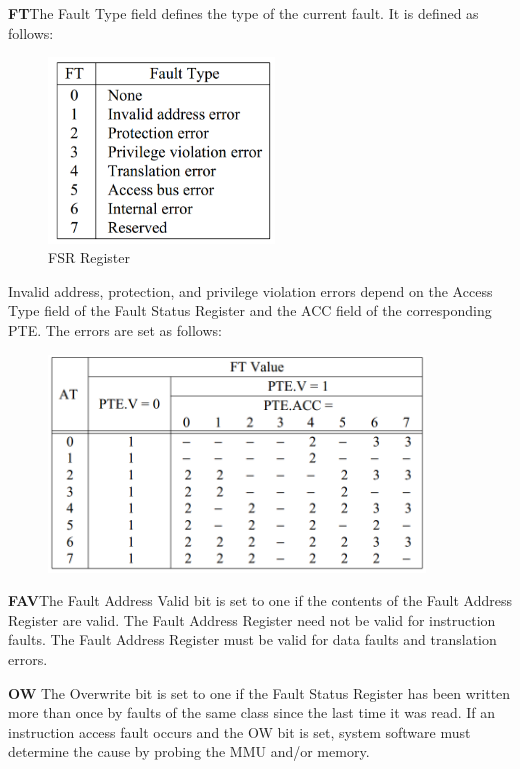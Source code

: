 \documentclass[12pt,a4paper]{article}
\begin{document}
\textbf{FT}The Fault Type field defines the type of the current fault. It is defined as follows:
\begin{figure}[h]
\centering
\includegraphics[width=6cm]{./figs/FT.png}
\caption{FSR Register}
\label{fig:AT}
\end{figure}

\newpage
Invalid address, protection, and privilege violation errors depend on the Access
Type field of the Fault Status Register and the ACC field of the corresponding
PTE. The errors are set as follows:
\begin{figure}[h]
\centering
\includegraphics[width=10cm]{./figs/AT_FT.png}
\caption{}
\label{fig:AT_FT}
\end{figure}

\textbf{FAV}The Fault Address Valid bit is set to one if the contents of the Fault
Address Register are valid. The Fault Address Register need not be valid
for instruction faults. The Fault Address Register must be valid for data
faults and translation errors.

\textbf{OW}
The Overwrite bit is set to one if the Fault Status Register has been written more than once by faults of the same class since the last time it was
read. If an instruction access fault occurs and the OW bit is set, system software must determine the cause by probing the MMU and/or memory. 
 
\end{document}
